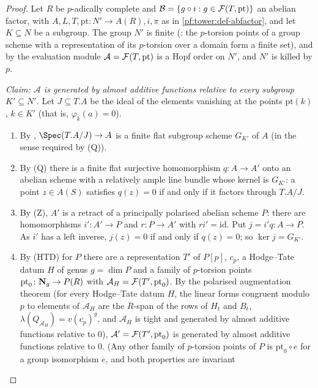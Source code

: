 \begin{proof}
Let $R$ be $p$-adically complete and $\mathcal B=\{g\circ i:g\in\mathcal F(T,\mathrm{pt})\}$ an abelian factor, with
$A,L,T,\mathrm{pt}\colon N'\to A(R),i,\pi$ as in \cref{pf:tower:def-abfactor}, and let $K\subseteq N$ be a subgroup. The group
$N'$ is finite (: the $p$-torsion points of a group scheme with a
representation of its $p$-torsion over a domain form a finite set), and by
 the evaluation module $\mathcal A=\mathcal F(T,\mathrm{pt})$ is a Hopf order
on $N'$, and $N'$ is killed by $p$.

\emph{Claim: $\mathcal A$ is generated by almost additive functions relative to every subgroup $K'\subseteq N'$.} Let
$J\subseteq T.A$ be the ideal of the elements vanishing at the points $\mathrm{pt}(k)$, $k\in K'$ (that is, $\varphi_k(a)=0$).
\begin{enumerate}[label=(\alph*)]
\item By , $\Spec(T.A/J)\to A$ is a finite flat subgroup scheme
  $G_{K'}$ of $A$ (in the sense required by (Q)).
\item By (Q) there is a finite flat surjective homomorphism $q\colon A\to A'$ onto an abelian scheme with a relatively ample
  line bundle whose kernel is $G_{K'}$: a point $z\in A(S)$ satisfies $q(z)=0$ if and only if it factors through $T.A/J$.
\item By (Z), $A'$ is a retract of a principally polarised abelian scheme $P$: there are homomorphisms $i'\colon A'\to P$ and
  $r\colon P\to A'$ with $ri'=\mathrm{id}$. Put $j=i'q\colon A\to P$. As $i'$ has a left inverse, $j(z)=0$ if and only if
  $q(z)=0$; so $\ker j=G_{K'}$.
\item By (HTD) for $P$ there are a representation $T'$ of $P[p]$, $c_p$, a Hodge--Tate datum $H$ of genus $g=\dim P$ and a
  family of $p$-torsion points $\mathrm{pt}_0\colon\mathbf N_g\to P(R)$ with $\mathcal A_H=\mathcal F(T',\mathrm{pt}_0)$. By the
  polarised augmentation theorem  (for every Hodge--Tate datum
  $H$, the linear forms congruent modulo $p$ to elements of $\mathcal A_H$ are the $R$-span of the rows of $H_t$ and $B_t$,
  $\lambda(Q_{\mathcal A_H})=v(c_p)^g$, and $\mathcal A_H$ is tight and generated by almost additive functions relative to
  $0$), $\mathcal A'=\mathcal F(T',\mathrm{pt}_0)$ is generated by almost additive functions relative to $0$. (Any other family
  of $p$-torsion points of $P$ is $\mathrm{pt}_0\circ e$ for a group isomorphism $e$, and both properties are invariant

\end{enumerate}
\end{proof}

